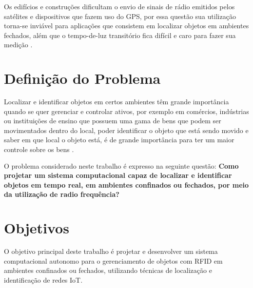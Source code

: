 \par
Os edifícios e construções dificultam o envio de sinais de rádio emitidos pelos satélites e dispositivos que fazem uso do GPS, 
por essa questão sua utilização torna-se inviável para aplicações que consistem em localizar objetos em ambientes fechados, 
além que o tempo-de-luz transitório fica difícil e caro para fazer sua medição \cite{rfid2009review}.

\section{Definição do Problema}

Localizar e identificar objetos em certos ambientes têm grande importância quando se quer gerenciar e controlar ativos, 
por exemplo em comércios, indústrias ou instituições de ensino que possuem uma gama de bens que podem ser movimentados dentro do local, 
poder identificar o objeto que está sendo movido e saber em que local o objeto está, é de grande importância para ter um maior 
controle sobre os bens \cite{realtimeRFID2016}. 

\par
O problema considerado neste trabalho é expresso na seguinte questão: 
\textbf{Como projetar um sistema computacional capaz de localizar e identificar objetos em tempo real, em ambientes confinados ou fechados,  
por meio da utilização de radio frequência?}

\section{Objetivos}
O objetivo principal deste trabalho é projetar e desenvolver um sistema computacional autonomo para o gerenciamento de objetos com RFID 
em ambientes confinados ou fechados, utilizando técnicas de localização e identificação de redes IoT.


